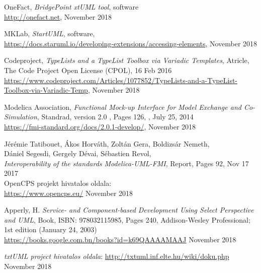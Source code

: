 \documentclass[a4paper,12pt]{report}
\begin{document}
\begin{thebibliography}{4}
	OneFact, \emph{BridgePoint xtUML tool}, software \\
	\url{http://onefact.net}, November 2018
	
	MKLab,  \emph{StartUML}, software, \\
	\url{https://docs.staruml.io/developing-extensions/accessing-elements}, November 2018
	
	Codeproject, \emph{TypeLists and a TypeList Toolbox via Variadic Templates}, Atricle,  The Code Project Open License (CPOL), 16 Feb 2016
	\url{https://www.codeproject.com/Articles/1077852/TypeLists-and-a-TypeList-Toolbox-via-Variadic-Temp},
	November 2018
	
	Modelica Association, 
	\emph{Functional Mock-up Interface for Model Exchange and Co-Simulation}, 
	Standrad, version 2.0 , Pages 126, , July 25, 2014  \\
	\url{https://fmi-standard.org/docs/2.0.1-develop/}, November 2018
	
	Jérémie Tatibouet, Ákos Horváth, Zoltán Gera, Boldizsár Nemeth, \\ 
	Dániel Segesdi, Gergely Dévai, Sébastien Revol, \\
	\emph{Interoperability of the standards Modelica-UML-FMI}, Report, Pages 92, Nov 17 2017 \\
	

	OpenCPS projekt hivatalos oldala: \\
	\url{https://www.opencps.eu/} November 2018
	
  Apperly, H.
  \emph{Service- and Component-based Development Using Select Perspective and UML}, Book, ISBN: 978032115985, Pages 240, Addison-Wesley Professional; 1st edition (January 24, 2003) \\
  \url{https://books.google.com.bn/books?id=k69QAAAAMAAJ} November 2018
  
	\emph{txtUML project hivatalos oldala}: \url{http://txtuml.inf.elte.hu/wiki/doku.php} November 2018
	
	
\end{thebibliography}
\end{document}
